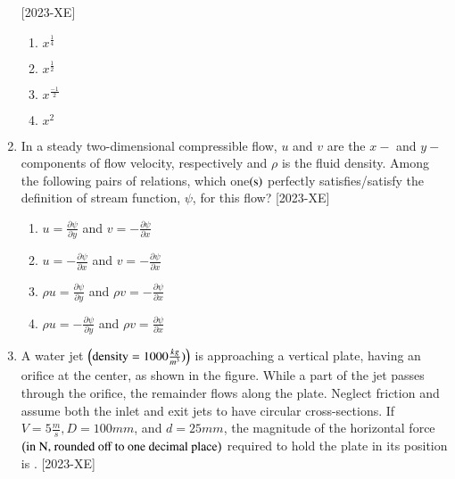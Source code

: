 \documentclass[journal]{IEEEtran}
\begin{document}
\begin{enumerate}[start=27]
    \hfill{[2023-XE]}\\
\begin{figure}[H]
			\centering
			
			\label{34}
		\end{figure}
\begin{enumerate}
    \item $x^ \frac{1}{4}$\\
    \item $x^ \frac{1}{2}$\\
    \item $x^ \frac{-1}{2}$\\
    \item $x^2$\\
\end{enumerate}
\item In a steady two-dimensional compressible flow, $u$ and $v$ are the $x-$ and $y-$ components of flow velocity, respectively and $\rho$ is the fluid density. Among the following pairs of relations, which one$\left(\text{s}\right)$ perfectly satisfies/satisfy the definition of stream function, $\psi$, for this flow? \hfill{[2023-XE]}\\
\begin{enumerate}
    \item $u=\frac{\partial \psi}{\partial y}$ and $v=- \frac{\partial \psi}{\partial x}$\\
    \item $u=-\frac{\partial \psi}{\partial x}$ and $v=- \frac{\partial \psi}{\partial x}$\\
    \item $\rho u=\frac{\partial \psi}{\partial y}$ and $\rho v=- \frac{\partial \psi}{\partial x}$\\
    \item $\rho u=-\frac{\partial \psi}{\partial y}$ and $\rho v=\frac{\partial \psi}{\partial x}$\\
\end{enumerate}
\item A water jet $\left(\text{density} = 1000 \frac{kg}{m^3})\right)$ is approaching a vertical plate, having an orifice at the center, as shown in the figure. While a part of the jet passes through the orifice, the remainder flows along the plate. Neglect friction and assume both the inlet and exit jets to have circular cross-sections. If $V = 5 \frac{m}{s}, D = 100 mm$, and $d = 25 mm$, the magnitude of the horizontal force $\left(\text{in N, rounded off to one decimal place}\right)$ required to hold the plate in its position is \underline{\hspace{1cm}}. \hfill{[2023-XE]}\\

\end{enumerate}
\end{document}

